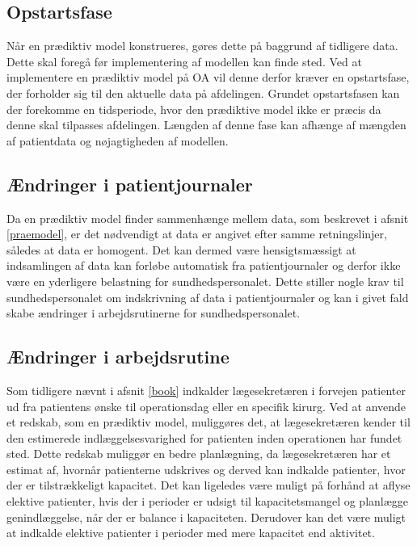 \subsection{Opstartsfase}
Når en prædiktiv model konstrueres, gøres dette på baggrund af tidligere data. Dette skal foregå før implementering af modellen kan finde sted. Ved at implementere en prædiktiv model på OA vil denne derfor kræver en opstartsfase, der forholder sig til den aktuelle data på afdelingen. Grundet opstartsfasen kan der forekomme en tidsperiode, hvor den prædiktive model ikke er præcis da denne skal tilpasses afdelingen. Længden af denne fase kan afhænge af mængden af patientdata og nøjagtigheden af modellen.\cite{Kuhn2013}


\subsection{Ændringer i patientjournaler}
Da en prædiktiv model finder sammenhænge mellem data, som beskrevet i afsnit \ref{praemodel}, er det nødvendigt at data er angivet efter samme retningslinjer, således at data er homogent\cite{Kuhn2013}. Det  kan dermed være hensigtsmæssigt at indsamlingen af data kan forløbe automatisk fra patientjournaler og derfor ikke være en yderligere belastning for sundhedspersonalet. Dette stiller nogle krav til sundhedspersonalet om indskrivning af data i patientjournaler og kan i givet fald skabe ændringer i arbejdsrutinerne for sundhedspersonalet.   


\subsection{Ændringer i arbejdsrutine}\label{arbjedsrut}
Som tidligere nævnt i afsnit \ref{book} indkalder lægesekretæren i forvejen patienter ud fra patientens ønske til operationsdag eller en specifik kirurg. Ved at anvende et redskab, som en prædiktiv model, muliggøres det, at lægesekretæren kender til den estimerede indlæggelsesvarighed for patienten inden operationen har fundet sted. 
Dette redskab muliggør en bedre planlægning, da lægesekretæren har et estimat af, hvornår patienterne udskrives og derved kan indkalde patienter, hvor der er tilstrækkeligt kapacitet. 
Det kan ligeledes være muligt på forhånd at aflyse elektive patienter, hvis der i perioder er udsigt til kapacitetsmangel og planlægge genindlæggelse, når der er balance i kapaciteten. Derudover kan det være muligt at indkalde elektive patienter i perioder med mere kapacitet end aktivitet. 


